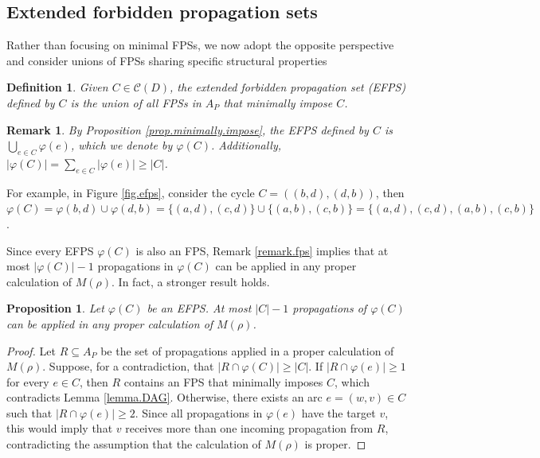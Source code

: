 \documentclass{article}
\newcommand{\CC}{{\mathscr C}}
\newtheorem{proposition}{Proposition}
\newtheorem{remark}{Remark}
\newtheorem{definition}{Definition}
\begin{document}
\subsection{Extended forbidden propagation sets}\label{subsec.efps}

Rather than focusing on minimal FPSs, we now adopt the opposite perspective and consider unions of FPSs sharing specific structural properties

\begin{definition}\label{def.efps}
    Given $C \in \CC(D)$, the \emph{extended forbidden propagation set} (EFPS) defined by $C$ is the union of all FPSs in $A_P$ that minimally impose $C$.
\end{definition}

\begin{remark}
    By Proposition \ref{prop.minimally.impose}, the EFPS defined by $C$ is $\bigcup_{e \in C} \varphi(e)$, which we denote by $\varphi(C)$.
    Additionally, $|\varphi(C)| = \sum_{e \in C} |\varphi(e)| \geq |C|$.
\end{remark}

For example, in Figure \ref{fig.efps}, consider the  cycle $C = ((b,d),(d,b))$, then $\varphi(C) = \varphi(b,d) \cup \varphi(d,b) = \{(a,d),(c,d)\} \cup \{(a,b),(c,b)\} = \{(a,d),(c,d),(a,b),(c,b)\}$.

Since every EFPS $\varphi(C)$ is also an FPS, Remark \ref{remark.fps} implies that at most $|\varphi(C)|-1$ propagations in $\varphi(C)$ can be applied in any proper calculation of $M(\rho)$. 
In fact, a stronger result holds.

\begin{proposition}\label{prop.efps}
Let $\varphi(C)$ be an EFPS. At most $|C| - 1$ propagations of $\varphi(C)$ can be applied in any proper calculation of $M(\rho)$.
\end{proposition}
\begin{proof}
Let $R \subseteq A_P$ be the set of propagations applied in a proper calculation of $M(\rho)$.
Suppose, for a contradiction, that $|R \cap \varphi(C)| \geq |C|$.
If $|R \cap \varphi(e)| \geq 1$ for every $e \in C$, then $R$ contains an FPS that minimally imposes $C$, which contradicts Lemma \ref{lemma.DAG}.
Otherwise, there exists an arc $e = (w,v) \in C$ such that $|R \cap \varphi(e)| \geq 2$.
Since all propagations in $\varphi(e)$ have the target $v$, this would imply that $v$ receives more than one incoming propagation from $R$, contradicting the assumption that the calculation of $M(\rho)$ is proper.
\end{proof}
\end{document}
